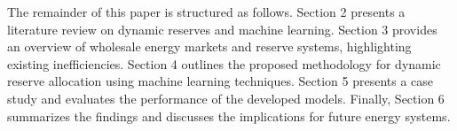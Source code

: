 The remainder of this paper is structured as follows. Section 2 presents a literature review on dynamic reserves and machine learning. Section 3 provides an overview of wholesale energy markets and reserve systems, highlighting existing inefficiencies. Section 4 outlines the proposed methodology for dynamic reserve allocation using machine learning techniques. Section 5 presents a case study and evaluates the performance of the developed models. Finally, Section 6 summarizes the findings and discusses the implications for future energy systems.\par

